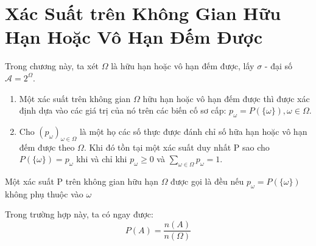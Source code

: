 \section{Xác Suất trên Không Gian Hữu Hạn Hoặc Vô Hạn Đếm Được}

Trong chương này, ta xét $\Omega$ là hữu hạn hoặc vô hạn đếm được, lấy $\sigma$ - đại số $\mathscr{A} = 2^\Omega$.

\begin{DL} 
\begin{enumerate}[\qquad a{)}]
	\item Một xác suất trên không gian $\Omega$ hữu hạn hoặc vô hạn đếm được thì được xác định dựa vào các giá trị của nó trên các biến cố sơ cấp: $p_\omega = P \left(\{\omega\} \right), \omega \in \Omega.$
	\item Cho $\left( p_\omega \right)_{\omega \in \Omega}$ là một họ các số thực được đánh chỉ số hữa hạn hoặc vô hạn đếm được theo $\Omega$. Khi đó tồn tại một xác suất duy nhất P sao cho $ P \left( \{\omega\} \right) = p_\omega$ khi và chỉ khi $p_\omega \ge 0$ và $\sum _{\omega \in \Omega} p_\omega = 1.$
	\end{enumerate}
\end{DL}

\begin{DN}
	Một xác suất P trên không gian hữu hạn $\Omega$ được gọi là đều nếu $p_\omega = P \left(\{\omega\} \right)$ không phụ thuộc vào $\omega$
	\end{DN}
	
	Trong trường hợp này, ta có ngay được:
	\[ P \left(A \right) = \frac{n(A)}{n( \Omega)}\]